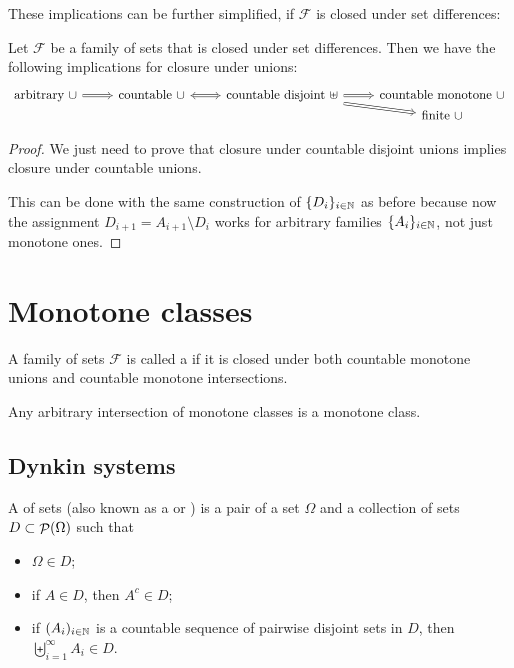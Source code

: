 These implications can be further simplified, if $\mathcal{F}$ is closed under set differences:
\begin{lemma}
Let $\mathcal{F}$ be a family of sets that is closed under set differences. Then we have the following implications for closure under unions:
\[ \begin{tikzcd}[row sep=0em]
\text{arbitrary $\cup$} \arrow[r, Rightarrow] & \text{countable $\cup$} \arrow[r, Leftrightarrow] & \text{countable disjoint $\uplus$} \arrow[r, Rightarrow] \arrow[dr, Rightarrow] & \text{countable monotone $\cup$} \\
&&& \text{finite $\cup$}
\end{tikzcd} \]
\end{lemma}
\begin{proof}
We just need to prove that closure under countable disjoint unions implies closure under countable unions.

This can be done with the same construction of $\{D_i\}_{i\in \mathbb{N}}$ as before because now the assignment $D_{i+1} = A_{i+1}\setminus D_i$ works for arbitrary families $\{A_i\}_{i\in \mathbb{N}}$, not just monotone ones.
\end{proof}

\section{Monotone classes}
\begin{definition}
A family of sets $\mathcal{F}$ is called a  if it is closed under both countable monotone unions and countable monotone intersections.
\end{definition}
\begin{lemma}
Any arbitrary intersection of monotone classes is a monotone class.
\end{lemma}

\subsection{Dynkin systems}
\begin{definition}
A  of sets (also known as a  or ) is a pair of a set $\Omega$ and a collection of sets $D\subset\mathop{\mathcal{P}}(\Omega)$ such that
\begin{itemize}
\item $\Omega\in D$;
\item if $A\in D$, then $A^c\in D$;
\item if $(A_i)_{i\in\mathbb{N}}$ is a countable sequence of pairwise disjoint sets in $D$, then $\biguplus_{i=1}^\infty A_i\in D$.
\end{itemize}
\end{definition}

